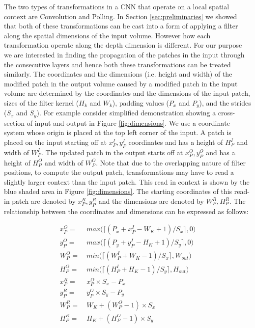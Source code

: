The two types of transformations in a CNN that operate on a local spatial context are Convolution and Polling. In Section \ref{sec:preliminaries} we showed that both of these transformations can be cast into a form of applying a filter along the spatial dimensions of the input volume.
However how each transformation operate along the depth dimension is different.
For our purpose we are interested in finding the propagation of the patches in the input through the consecutive layers and hence both these transformations can be treated similarly.
The coordinates and the dimensions (i.e. height and width) of the modified patch in the output volume caused by a modified patch in the input volume are determined by the coordinates and the dimensions of the input patch, sizes of the filter kernel ($H_k$ and $W_k$), padding values ($P_x$ and $P_y$), and the strides ($S_x$ and $S_y$).
For example consider simplified demonstration showing a cross-section of input and output in Figure \ref{fig:dimensions}.
We use a coordinate system whose origin is placed at the top left corner of the input.
A patch is placed on the input starting off at $x^I_P, y^I_P$ coordinates and has a height of $H^I_P$ and width of $W^I_P$.
The updated patch in the output starts off at $x^O_P, y^O_P$ and has a height of $H^O_P$ and width of $W^O_P$.
Note that due to the overlapping nature of filter positions, to compute the output patch, transformations may have to read a slightly larger context than the input patch. This read in context is shown by the blue shaded area in Figure \ref{fig:dimensions}.
The starting coordinates of this read-in patch are denoted by $x^R_P, y^R_P$ and the dimensions are denoted by $W^R_P, H^R_P$.
The relationship between the coordinates and dimensions can be expressed as follows:

\begin{align}
\label{eqn:xcoordinate}
x^O_P =&~ max\big(\lceil (P_x + x^I_P - W_K + 1)/S_x \rceil, 0\big)\\
\label{eqn:ycoordinate}
y^O_P =&~ max\big(\lceil (P_y + y^I_P - H_K + 1)/S_y \rceil, 0\big)\\
\label{eqn:patchwidth}
W^O_P =&~ min\big(\lceil (W^I_P + W_K - 1)/S_x \rceil, W_{out}\big)\\
\label{eqn:patchheight}
H^O_P =&~ min\big(\lceil (H^I_P + H_K - 1)/S_y \rceil, H_{out}\big)\\
\label{eqn:xreadcoordinate}
x^R_P =&~ x^O_P \times S_x - P_x\\
\label{eqn:yreadcoordinate}
y^R_P =&~ y^O_P \times S_y - P_y\\
\label{eqn:readpatchwidth}
W^R_P =&~ W_K + (W^O_P-1) \times S_x\\
\label{eqn:readpatchheight}
H^R_P =&~ H_K + (H^O_P-1) \times S_y
\end{align}


